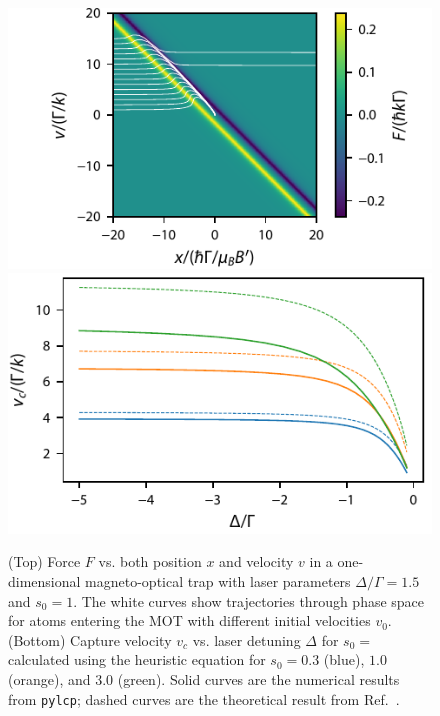 \documentclass[final,5p,times,twocolumn]{elsarticle}
\begin{document}
\begin{figure}
	\center
	\includegraphics{figs/F0_to_F1_MOT_force_with_incoming_trajectories.pdf}
	\includegraphics{figs/F0_to_F1_MOT_capture}
	\caption{\label{fig:mot_forces} (Top) Force $F$ vs. both position $x$ and velocity $v$ in a one-dimensional magneto-optical trap with laser parameters $\Delta/\Gamma=1.5$ and $s_0=1$.  The white curves show trajectories through phase space for atoms entering the MOT with different initial velocities $v_0$. (Bottom) Capture velocity $v_c$ vs. laser detuning $\Delta$ for $s_0=$ calculated using the heuristic equation for $s_0=0.3$ (blue), $1.0$ (orange), and $3.0$ (green).  Solid curves are the numerical results from {\tt pylcp}; dashed curves are the theoretical result from Ref.~\cite{Haubrich1993}.}
\end{figure}
\end{document}
